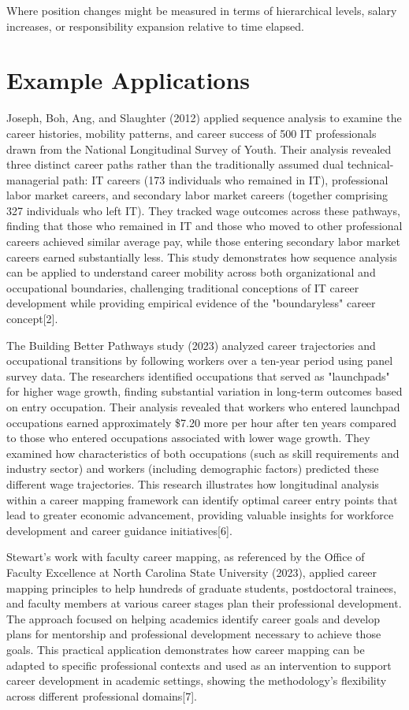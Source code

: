 \documentclass{article}
\begin{document}
Where position changes might be measured in terms of hierarchical levels, salary increases, or responsibility expansion relative to time elapsed.

\section{Example Applications}

Joseph, Boh, Ang, and Slaughter (2012) applied sequence analysis to examine the career histories, mobility patterns, and career success of 500 IT professionals drawn from the National Longitudinal Survey of Youth. Their analysis revealed three distinct career paths rather than the traditionally assumed dual technical-managerial path: IT careers (173 individuals who remained in IT), professional labor market careers, and secondary labor market careers (together comprising 327 individuals who left IT). They tracked wage outcomes across these pathways, finding that those who remained in IT and those who moved to other professional careers achieved similar average pay, while those entering secondary labor market careers earned substantially less. This study demonstrates how sequence analysis can be applied to understand career mobility across both organizational and occupational boundaries, challenging traditional conceptions of IT career development while providing empirical evidence of the "boundaryless" career concept[2].

The Building Better Pathways study (2023) analyzed career trajectories and occupational transitions by following workers over a ten-year period using panel survey data. The researchers identified occupations that served as "launchpads" for higher wage growth, finding substantial variation in long-term outcomes based on entry occupation. Their analysis revealed that workers who entered launchpad occupations earned approximately \$7.20 more per hour after ten years compared to those who entered occupations associated with lower wage growth. They examined how characteristics of both occupations (such as skill requirements and industry sector) and workers (including demographic factors) predicted these different wage trajectories. This research illustrates how longitudinal analysis within a career mapping framework can identify optimal career entry points that lead to greater economic advancement, providing valuable insights for workforce development and career guidance initiatives[6].

Stewart's work with faculty career mapping, as referenced by the Office of Faculty Excellence at North Carolina State University (2023), applied career mapping principles to help hundreds of graduate students, postdoctoral trainees, and faculty members at various career stages plan their professional development. The approach focused on helping academics identify career goals and develop plans for mentorship and professional development necessary to achieve those goals. This practical application demonstrates how career mapping can be adapted to specific professional contexts and used as an intervention to support career development in academic settings, showing the methodology's flexibility across different professional domains[7].
\end{document}
